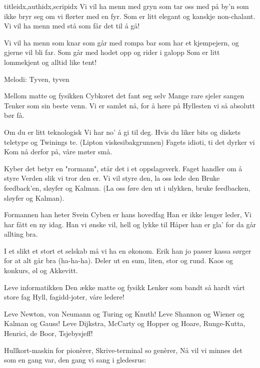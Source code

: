 \documentclass[14pt,letterpaper,norsk]{article}
\begin{document}
\begin{songs}{titleidx,authidx,scripidx}
\beginverse
Vi vil ha menn med gryn
som tar oss med på by'n
som ikke bryr seg om vi flørter med en fyr.
Som er litt elegant
og kanskje non-chalant.
Vi vil ha menn med stå som får det til å gå!
\endverse

\beginverse
Vi vil ha menn som knar
som går med rompa bar
som har et kjempejern, og gjerne vil bli far.
Som går med hodet opp
og rider i galopp
Som er litt lommekjent og alltid like tent!
\endverse
\endsong


{\footnotesize Melodi: Tyven, tyven}

\beginverse
Mellom matte og fysikken
Cybkoret det fant seg selv
Mange rare sjeler sangen 
Tenker som sin beste venn.
Vi er samlet nå, for å høre på 
Hyllesten vi så absolutt bør få.
\endverse

\beginverse
Om du er litt teknologisk
Vi har no' å gi til deg.
Hvis du liker bits og diskets
teletype og Twinings te.
(Lipton viskesibakgrunnen) 
Fagets idioti, ti det dyrker vi
Kom nå derfor på, våre møter små.
\endverse

\beginverse
Kyber det betyr en "rormann", 
står det i et oppslagsverk. 
Faget handler om å styre 
Verden slik vi tror den er. 
Vi vil styre den, la oss lede den 
Bruke feedback'en, sløyfer og Kalman. 
(La oss føre den ut i ulykken, 
bruke feedbacken, sløyfer og Kalman).
\endverse

\beginverse
Formannen han heter Svein 
Cyben er hans hovedfag 
Han er ikke lenger leder, 
Vi har fått en ny idag. 
Han vi ønske vil, hell og lykke til 
Håper han er gla' for da går allting bra.
\endverse

\beginverse
I et slikt et stort et selskab 
må vi ha en økonom. 
Erik han jo passer kassa 
sørger for at alt går bra (ha-ha-ha). 
Deler ut en sum, liten, stor og rund.
Kaos og konkurs, øl og Akkevitt.
\endverse
\endsong

\begin{intersong*}
\end{intersong*}

\beginverse
Leve informatikken
Den ække matte og fysikk
Lenker som bandt så hardt vårt store fag
Hyll, fagidd-joter, våre ledere!
\endverse

\beginchorus
Leve Newton, von Neumann og Turing og Knuth!
Leve Shannon og Wiener og Kalman og Gauss!
Leve Dijkstra, McCarty og Hopper og Hoare,
Runge-Kutta, Henrici, de Boor, Tsjebysjeff!
\endchorus

\beginverse
Hullkort-maskin for pionèrer,
Skrive-terminal so genèrer,
Nå vil vi minnes det som en gang var,
den gang vi sang i gledesrus:
\endverse


\end{songs}
\end{document}
